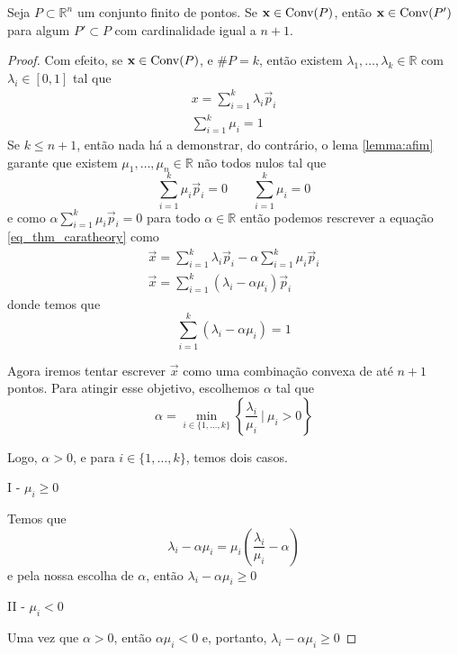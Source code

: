 \begin{thm:caratheodory}[Carathéodory]
	Seja $P \subset \mathbb{R}^n$ um conjunto finito de pontos. Se $\mathbf x \in \mathrm{Conv}(P)$, então
	  $\mathbf x \in \mathrm{Conv}(P')$ para algum $P' \subset P$ com cardinalidade igual a $n + 1$.

	\begin{proof}
		Com efeito, se $\mathbf x \in \mathrm{Conv}(P)$, e $\#P = k$, então existem $\lambda_1, \ldots, \lambda_k
		\in \mathbb{R}$ com $\lambda_i \in [0, 1]$ tal que
		\begin{equation}
		\label{eq_thm_caratheory}
		\begin{gathered}
			x = \displaystyle\sum_{i=1}^k \lambda_i \vec p_i \\
			\displaystyle\sum_{i=1}^k \mu_i = 1
		\end{gathered}
		\end{equation}
		Se $k \leq n + 1$, então nada há a demonstrar, do contrário, o lema \ref{lemma:afim}
		garante que existem $\mu_1, \ldots, \mu_n \in \mathbb{R}$ não todos nulos tal que
		\[
		  \displaystyle\sum_{i=1}^k \mu_i \vec p_i = 0 \quad\quad \sum_{i=1}^{k} \mu_i = 0
		\]
		e como \(\alpha \displaystyle\sum_{i=1}^k \mu_i \vec p_i = 0\) para todo $\alpha \in \mathbb{R}$
		então podemos rescrever a equação \ref{eq_thm_caratheory} como
		\begin{gather*}
			\vec x = \displaystyle\sum_{i=1}^k \lambda_i \vec p_i - \alpha \displaystyle\sum_{i=1}^k \mu_i \vec p_i \\
			\vec x = \displaystyle\sum_{i=1}^k (\lambda_i - \alpha \mu_i) \vec p_i
		\end{gather*}
		donde temos que
		\[\displaystyle\sum_{i=1}^k (\lambda_i - \alpha \mu_i) = 1\]

		Agora iremos tentar escrever $\vec x$ como uma combinação convexa de até $n + 1$ pontos.
		Para atingir esse objetivo, escolhemos $\alpha$ tal que
	    \[
	      \alpha = \min_{i \in \{1, \dots, k\}} \left\{\frac{\lambda_i}{\mu_i}\ |\ \mu_i > 0\right\}
	    \]

		Logo, $\alpha > 0$, e para $i \in \{1, \ldots, k\}$, temos dois casos.

		I - $\mu_i \geq 0$

		Temos que
		\[\lambda_i - \alpha \mu_i = \mu_i \left(\frac{\lambda_i}{\mu_i} - \alpha\right)\]
		e pela nossa escolha de $\alpha$, então \(\lambda_i - \alpha \mu_i \geq 0\)

		II - $\mu_i < 0$

		Uma vez que $\alpha > 0$, então $\alpha \mu_i < 0$ e, portanto,
		\(\lambda_i - \alpha \mu_i \geq 0\)


\end{proof}
\end{thm:caratheodory}
